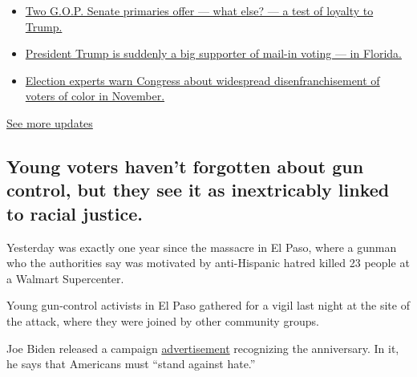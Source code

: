 \begin{itemize}
\tightlist
\item
  \href{https://www.nytimes3xbfgragh.onion/2020/08/04/us/elections/primary-election-michigan-arizona-kansas.html?action=click\&pgtype=Article\&state=default\&region=MAIN_CONTENT_1\&context=storylines_live_updates\#link-3924dd44}{Two
  G.O.P. Senate primaries offer --- what else? --- a test of loyalty to
  Trump.}
\item
  \href{https://www.nytimes3xbfgragh.onion/2020/08/04/us/elections/primary-election-michigan-arizona-kansas.html?action=click\&pgtype=Article\&state=default\&region=MAIN_CONTENT_1\&context=storylines_live_updates\#link-32b39e33}{President
  Trump is suddenly a big supporter of mail-in voting --- in Florida.}
\item
  \href{https://www.nytimes3xbfgragh.onion/2020/08/04/us/elections/primary-election-michigan-arizona-kansas.html?action=click\&pgtype=Article\&state=default\&region=MAIN_CONTENT_1\&context=storylines_live_updates\#link-6d019753}{Election
  experts warn Congress about widespread disenfranchisement of voters of
  color in November.}
\end{itemize}

\href{https://www.nytimes3xbfgragh.onion/2020/08/04/us/elections/primary-election-michigan-arizona-kansas.html?action=click\&pgtype=Article\&state=default\&region=MAIN_CONTENT_1\&context=storylines_live_updates}{See
more updates}

\hypertarget{young-voters-havent-forgotten-about-gun-control-but-they-see-it-as-inextricably-linked-to-racial-justice}{%
\subsection{Young voters haven't forgotten about gun control, but they
see it as inextricably linked to racial
justice.}\label{young-voters-havent-forgotten-about-gun-control-but-they-see-it-as-inextricably-linked-to-racial-justice}}

Yesterday was exactly one year since the massacre in El Paso, where a
gunman who the authorities say was motivated by anti-Hispanic hatred
killed 23 people at a Walmart Supercenter.

Young gun-control activists in El Paso gathered for a vigil last night
at the site of the attack, where they were joined by other community
groups.

Joe Biden released a campaign
\href{https://www.youtube.com/watch?v=BbQQEPwarmU}{advertisement}
recognizing the anniversary. In it, he says that Americans must ``stand
against hate.''

